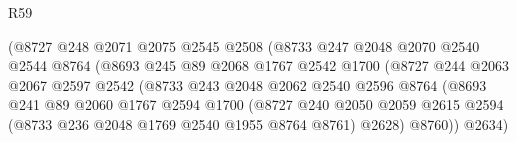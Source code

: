 \begin{lexlean}{R59}
\begin{coremodule}
                                      (@8727
                                        @248
                                        @2071
                                        @2075
                                        @2545
                                        @2508
                                        (@8733
                                          @247
                                          @2048
                                          @2070
                                          @2540
                                          @2544
                                          @8764
                                          (@8693
                                            @245
                                            @89
                                            @2068
                                            @1767
                                            @2542
                                            @1700
                                            (@8727
                                              @244
                                              @2063
                                              @2067
                                              @2597
                                              @2542
                                              (@8733
                                                @243
                                                @2048
                                                @2062
                                                @2540
                                                @2596
                                                @8764
                                                (@8693
                                                  @241
                                                  @89
                                                  @2060
                                                  @1767
                                                  @2594
                                                  @1700
                                                  (@8727
                                                    @240
                                                    @2050
                                                    @2059
                                                    @2615
                                                    @2594
                                                    (@8733 @236 @2048 @1769 @2540 @1955 @8764 @8761)
                                                    @2628)
                                                  @8760))
                                              @2634)

\end{coremodule}
\end{lexlean}
